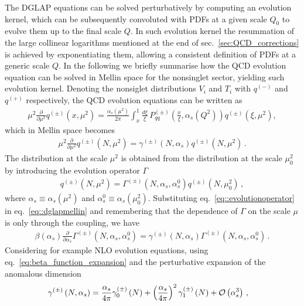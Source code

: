 %
The DGLAP equations can be solved perturbatively by computing an evolution kernel, which can be subsequently convoluted
with PDFs at a given scale $Q_0$ to evolve them up to the final scale $Q$.
In such evolution kernel the resummation of the large collinear logarithms mentioned at the end of sec.~\ref{sec:QCD_corrections}
is achieved by exponentiating them, allowing a consistent definition of PDFs at a generic scale $Q$.
In the following we briefly summarise how the QCD evolution equation can be solved in Mellin space for the
nonsinglet sector, yielding such evolution kernel.
%
Denoting the nonsiglet distributions $V_i$ and $T_i$ with $q^{(-)}$ and
$q^{(+)} $ respectively, the QCD evolution equations can be written as
\begin{align}
    \mu^2\frac{\partial }{\partial \mu^2} q^{(\pm)}\left(x,\mu^2\right) = 
    \frac{\alpha_s(\mu^2)}{2\pi}
    \int_{x}^{1}\frac{d\xi}{\xi}\, 
    P_{qq}^{(\pm)}\left(\frac{x}{\xi},\alpha_s(Q^2)\right)
    q^{(\pm)}\left(\xi,\mu^2\right),
\end{align}
which in Mellin space becomes
\begin{align}
\label{eq::dglapmellin}
    \mu^2\frac{\partial }{\partial \mu^2} q^{(\pm)}\left(N,\mu^2\right) = 
    \gamma^{(\pm)}\left(N, \alpha_s\right) q^{(\pm)}\left(N,\mu^2\right)\, .
\end{align}
The distribution at the scale $\mu^2$ is obtained from the distribution at the
scale $\mu_0^2$ by introducing the evolution operator $\Gamma$
\begin{align}
\label{eq::evolutionoperator}
    q^{(\pm)}\left(N,\mu^2\right) = 
    \Gamma^{(\pm)}\left(N,\alpha_s,\alpha_s^0\right)
    q^{(\pm)}\left(N,\mu_0^2\right)\, ,
\end{align}
where $\alpha_s \equiv \alpha_s\left(\mu^2\right)$ and $\alpha_s^0 \equiv
\alpha_s\left(\mu_0^2\right)$. Substituting eq.~\eqref{eq::evolutionoperator} in
eq.~\eqref{eq::dglapmellin} and remembering that the dependence of $\Gamma$ on
the scale $\mu$ is only through the coupling, we have
\begin{align}
\label{eq::Mdglap}
    \beta\left(\alpha_s\right) \frac{\partial}{\partial\alpha_s}
    \Gamma^{(\pm)}\left(N,\alpha_s,\alpha_s^0\right) = 
    \gamma^{(\pm)}\left(N, \alpha_s\right)
    \Gamma^{(\pm)}\left(N,\alpha_s,\alpha_s^0\right)\, .
\end{align}
%
Considering for example NLO evolution equations, using eq.~\eqref{eq:beta_function_expansion}
and the perturbative expansion of the anomalous dimension 
\begin{align}
    & \gamma^{(\pm)}\left(N, \alpha_s\right) = 
    \frac{\alpha_s}{4\pi} \gamma^{(\pm)}_0\left(N\right) + 
    \left(\frac{\alpha_s}{4\pi}\right)^2 \gamma^{(\pm)}_1\left(N\right) + \mathcal{O}\left( \alpha_s^3 \right)\, ,
\end{align}
